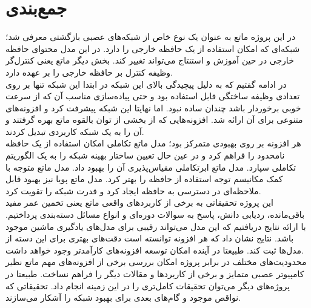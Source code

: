 \chapter{جمع‌بندی}
در این پروژه ماتع به عنوان یک نوع خاص از شبکه‌های عصبی بازگشتی معرفی شد؛ شبکه‌ای که امکان استفاده از یک حافظه خارجی را دارد. در این مدل محتوای حافظه خارجی در حین آموزش و استنتاج می‌تواند تغییر کند. بخش دیگر ماتع یعنی کنترل‌گر وظیفه کنترل بر حافظه خارجی را بر عهده دارد.
\\

در ادامه گفتیم که به دلیل پیچیدگی بالای این شبکه در ابتدا این شبکه تنها بر روی تعدادی وظیفه ساختگی قابل استفاده بود و حتی پیاده‌سازی مناسب آن که از سرعت خوبی برخوردار باشد چندان ساده نبود. اما نهایتا این شبکه پیشرفت کرد و افزونه‌های متنوعی برای آن ارائه شد. افزونه‌هایی که از بخشی از توان بالقوه ماتع بهره گرفتند و آن را به یک شبکه کاربردی تبدیل کردند.
\\

هر افزونه بر روی بهبودی متمرکز بود؛ مدل ماتع تکاملی امکان استفاده از یک حافظه نامحدود را فراهم کرد و در عین حال تعیین ساختار بهینه شبکه را به یک الگوریتم تکاملی سپارد. مدل ماتع ابرتکاملی مقیاس‌پذیری آن را بهبود داد. مدل ماتع متوجه با کمک مکانیسم توجه استفاده از حافظه را بهتر کرد. مدل ماتع پویا نیز بهبود قابل ملاحظه‌ای در دسترسی به حافظه ایجاد کرد و قدرت شبکه را تقویت کرد. 
\\

این پروژه تحقیقاتی به برخی از کاربردهای واقعی ماتع یعنی تخمین عمر مفید باقی‌مانده، ردیابی دانش، پاسخ به سوالات دوره‌ای و انواع مسائل دسته‌بندی پرداختیم. با ارائه نتایج دریافتیم که این مدل می‌تواند رقیبی برای مدل‌های یادگیری ماشین موجود باشد. نتایج نشان داد که هر افزونه توانسته است دقت‌های بهتری برای این دسته از مدل‌ها ثبت کند. طبیعتا در آینده امکان توسعه افزونه‌های کارآمدتر وجود خواهد داشت.
\\

محدودیت‌های مختلف در برابر پروژه امکان بررسی برخی از افزونه‌های مهم ماتع نظیر کامپیوتر عصبی متمایز و برخی از کاربردها و مقالات دیگر را فراهم نساخت. طبیعتا در پروژه‌های دیگر می‌توان تحقیقات کامل‌تری را در این زمینه انجام داد. تحقیقاتی که نواقص موجود و گام‌های بعدی برای بهبود شبکه را آشکار می‌سازند.